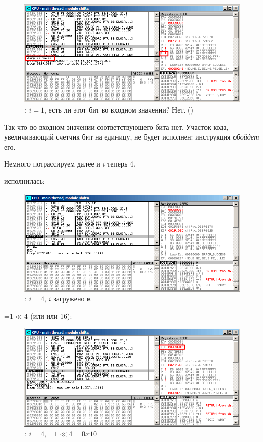 \begin{figure}[H]
\centering
\includegraphics[scale=\FigScale]{patterns/14_bitfields/4_popcnt/olly1_3.png}
\caption{\olly: $i=1$, есть ли этот бит во входном значении? Нет.
 ()}
\label{fig:shifts_olly1_3}
\end{figure}

Так что во входном значении соответствующего бита нет.
Участок кода, увеличивающий счетчик бит на единицу, не будет исполнен: инструкция \JZ \emph{обойдет} его.

\clearpage
Немного потрассируем далее и $i$ теперь 4.%

\SHL исполнилась:

\begin{figure}[H]
\centering
\includegraphics[scale=\FigScale]{patterns/14_bitfields/4_popcnt/olly4_1.png}
\caption{\olly: $i=4$, $i$ загружено в \ECX}
\label{fig:shifts_olly4_1}
\end{figure}

\clearpage
\EDX=$1 \ll 4$ (или  или 16): 

\begin{figure}[H]
\centering
\includegraphics[scale=\FigScale]{patterns/14_bitfields/4_popcnt/olly4_2.png}
\caption{\olly: $i=4$, \EDX=$1 \ll 4=0x10$}
\label{fig:shifts_olly4_2}
\end{figure}


